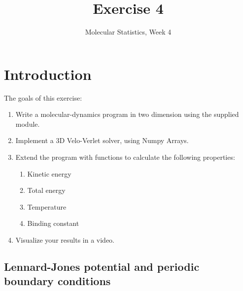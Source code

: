 \documentclass{article}
\title{Exercise 4}
\author{Molecular Statistics, Week 4}
\date{}
\begin{document}

\maketitle

\section{Introduction}

The goals of this exercise:
\begin{enumerate}
    \item Write a molecular-dynamics program in two dimension using the supplied module.

    \item Implement a 3D Velo-Verlet solver, using Numpy Arrays.

    \item Extend the program with functions to calculate the following properties:

    \begin{enumerate}
        \item Kinetic energy
        \item Total energy
        \item Temperature
        \item Binding constant
    \end{enumerate}

    \item Visualize your results in a video.

\end{enumerate}


\subsection{Lennard-Jones potential and periodic boundary conditions}
\end{document}

